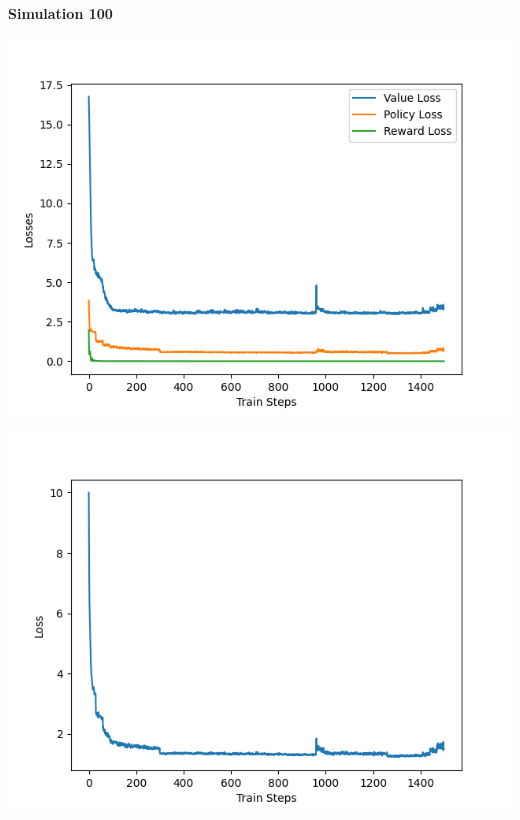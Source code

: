 \documentclass[12pt]{article}
\begin{document}
\begin{tcolorbox}[height=45em, width=\textwidth]
\begin{center}
        \textbf{Simulation 100} \\
        \begin{minipage}{0.32\textwidth}
            \includegraphics[width=\textwidth]{outputs/plots/sim_100/training/individual_losses.png}
        \end{minipage}%
        \hfill%
        \begin{minipage}{0.32\textwidth}
            \includegraphics[width=\textwidth]{outputs/plots/sim_100/training/total_loss.png}
        \end{minipage}%
        \hfill%
        \begin{minipage}{0.32\textwidth}

\end{minipage}
\end{center}
\end{tcolorbox}
\end{document}
